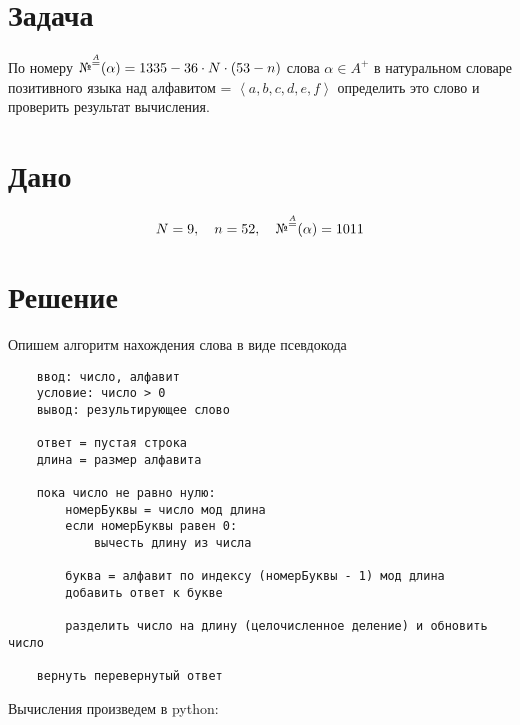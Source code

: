 \documentclass[letterpaper, 11pt]{extarticle}
\begin{document}


\section*{Задача }

\begin{spacing}{1.5}
По номеру $ \text{\textnumero}^{\stackrel{A}{=}} (\alpha) =  1335 - 36 \cdot N \cdot (53 - n)$ 
слова $\alpha \in A^{+}$ в натуральном словаре позитивного языка над алфавитом 
 = $\left<a,b,c,d,e,f\right>$ определить это слово и проверить результат вычисления.
\end{spacing}

\section*{Дано}

\begin{equation*}
    N = 9, \quad n = 52, \quad \text{\textnumero}^{\stackrel{A}{=}} (\alpha) = 1011
\end{equation*}

\section*{Решение}

Опишем алгоритм нахождения слова в виде псевдокода
\begin{tcolorbox}[colback=gray!10, colframe=gray!50, title=Псевдокод алгоритма нахождения слова по его номеру в лексикографическом словаре]
    \begin{verbatim}
    ввод: число, алфавит
    условие: число > 0
    вывод: результирующее слово
    
    ответ = пустая строка
    длина = размер алфавита

    пока число не равно нулю:
        номерБуквы = число мод длина
        если номерБуквы равен 0:
            вычесть длину из числа

        буква = алфавит по индексу (номерБуквы - 1) мод длина
        добавить ответ к букве

        разделить число на длину (целочисленное деление) и обновить число

    вернуть перевернутый ответ

    \end{verbatim}
\end{tcolorbox}

\noindent Вычисления произведем в python:
\end{document}
